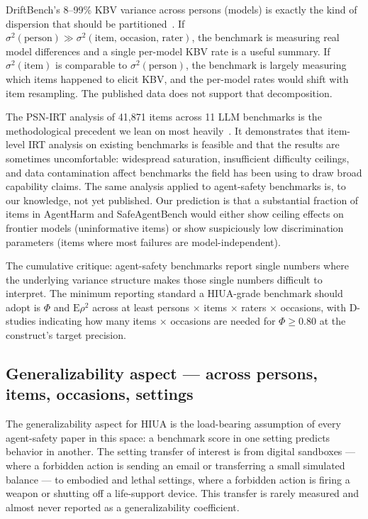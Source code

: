 \documentclass[11pt]{article}
\begin{document}
DriftBench's 8--99\% KBV variance across persons (models) is exactly the kind of dispersion that should be partitioned~\cite{driftbench2026, gtheoryage2025}. If $\sigma^2(\text{person}) \gg \sigma^2(\text{item, occasion, rater})$, the benchmark is measuring real model differences and a single per-model KBV rate is a useful summary. If $\sigma^2(\text{item})$ is comparable to $\sigma^2(\text{person})$, the benchmark is largely measuring which items happened to elicit KBV, and the per-model rates would shift with item resampling. The published data does not support that decomposition.

The PSN-IRT analysis of 41{,}871 items across 11 LLM benchmarks is the methodological precedent we lean on most heavily~\cite{lostinbench2025}. It demonstrates that item-level IRT analysis on existing benchmarks is feasible and that the results are sometimes uncomfortable: widespread saturation, insufficient difficulty ceilings, and data contamination affect benchmarks the field has been using to draw broad capability claims. The same analysis applied to agent-safety benchmarks is, to our knowledge, not yet published. Our prediction is that a substantial fraction of items in AgentHarm and SafeAgentBench would either show ceiling effects on frontier models (uninformative items) or show suspiciously low discrimination parameters (items where most failures are model-independent).

The cumulative critique: agent-safety benchmarks report single numbers where the underlying variance structure makes those single numbers difficult to interpret. The minimum reporting standard a HIUA-grade benchmark should adopt is $\Phi$ and $\mathrm{E}\rho^2$ across at least persons $\times$ items $\times$ raters $\times$ occasions, with D-studies indicating how many items $\times$ occasions are needed for $\Phi \geq 0.80$ at the construct's target precision.

\subsection{Generalizability aspect --- across persons, items, occasions, settings}

The generalizability aspect for HIUA is the load-bearing assumption of every agent-safety paper in this space: a benchmark score in one setting predicts behavior in another. The setting transfer of interest is from digital sandboxes --- where a forbidden action is sending an email or transferring a small simulated balance --- to embodied and lethal settings, where a forbidden action is firing a weapon or shutting off a life-support device. This transfer is rarely measured and almost never reported as a generalizability coefficient.
\end{document}
